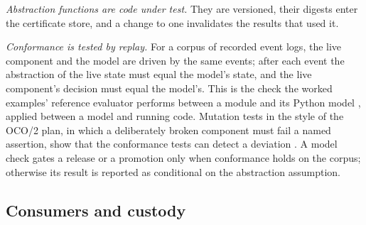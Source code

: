 \documentclass[11pt]{article}
\theoremstyle{definition}
\theoremstyle{plain}
\begin{document}
\emph{Abstraction functions are code under test.} They are versioned, their digests enter the
certificate store, and a change to one invalidates the results that used it.

\emph{Conformance is tested by replay.} For a corpus of recorded event logs, the live component and
the model are driven by the same events; after each event the abstraction of the live state must
equal the model's state, and the live component's decision must equal the model's. This is the
check the worked examples' reference evaluator performs between a module and its Python model
\cite[Appendix~C]{worked}, applied between a model and running code. Mutation tests in the style of
the OCO/2 plan, in which a deliberately broken component must fail a named assertion, show that the
conformance tests can detect a deviation \cite{oco2}. A model check gates a release or a
promotion only when conformance holds on the corpus; otherwise its result is reported as
conditional on the abstraction assumption.

\subsection{Consumers and custody}\label{sec:custody}
\end{document}
